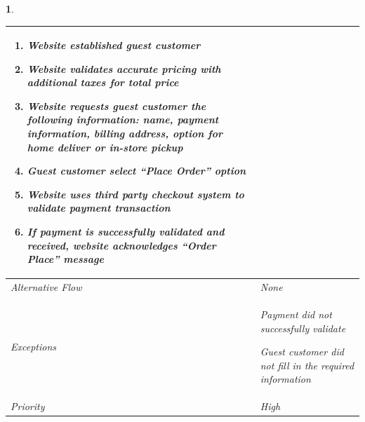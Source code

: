 \documentclass{scrreprt}
\theoremstyle{funreq}
\newtheorem{funreq}{}
\begin{document}
\begin{funreq}
\begin{table}[H]
{\begin{tabularx}{\columnwidth}{|l|X|}
\begin{enumerate}
					\item Website established guest customer
					
					\item Website validates accurate pricing with additional taxes for total price
					
					\item Website requests guest customer the following information: name, payment information, billing address, option for home deliver or in-store pickup
					
					\item Guest customer select “Place Order” option
					
					\item Website uses third party checkout system to validate payment transaction
					
					\item If payment is successfully validated and received, website acknowledges “Order Place” message
				\end{enumerate}
					\\ \hline
					
					Alternative Flow & None                                       \\ \hline
					Exceptions       & Payment did not successfully validate
					
					Guest customer did not fill in the required information
					\\ \hline
					Priority & High                                       \\ \hline
				\end{tabularx}%
			}
		\end{table}
	\end{funreq}
\end{document}
